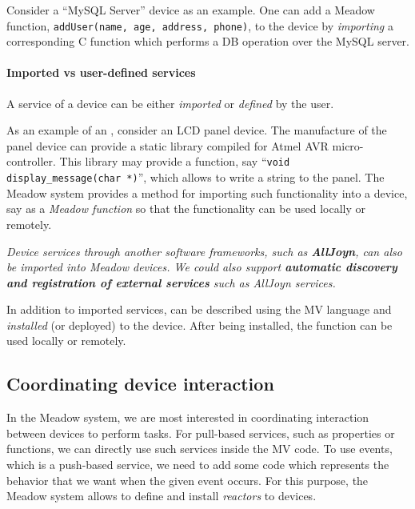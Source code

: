 \documentclass{note}
\begin{document}
Consider a ``MySQL Server'' device as an example. One can add
a Meadow function, \textcolor{red2}{\texttt{addUser(name, age, address,
    phone)}}, to the device by \textcolor{blue2}{\em importing\/} a
corresponding C function which performs a DB operation over the MySQL server.


\paragraph{Imported vs user-defined services}
A service of a device can be either {\em imported\/}  or {\em defined\/} by
the user. 

As an example of an \textcolor{blue2}{}, consider an LCD
panel device. The manufacture of the panel device can provide a static library 
compiled for Atmel AVR micro-controller.
This library may provide a function, say
``\textcolor{red2}{\texttt{void display\_message(char *)}}'', which allows to 
write a string to the panel. The Meadow system provides a method for importing
such functionality into a device, say as a {\em Meadow function\/} so that 
the functionality can be used locally or remotely.

\textcolor{blue2}{\em Device services through another software frameworks,
  such as {\bf\em AllJoyn}, can also be imported into Meadow devices.
We could also support {\bf\em automatic discovery and registration of
external services\/} such as AllJoyn services.}


In addition to imported services, \textcolor{blue2}{} can be described using the {MV  language} and {\em
  installed\/} (or deployed) to the device. After being installed, the
function can be used locally or remotely.


\subsection{Coordinating device interaction}
In the Meadow system, we are most interested in coordinating interaction
between devices to perform tasks.
For pull-based services, such as properties or functions, we can 
directly use such services inside the MV code. To use events, which 
is a push-based service, we need to add some code which represents the
behavior that we want when the given event occurs.
For this purpose, the Meadow system allows to define and install {\em
  reactors\/} to devices.
\end{document}

